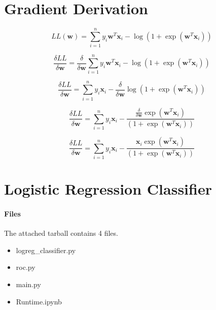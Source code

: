 \documentclass[11pt]{article}
\begin{document}
\maketitle

\section{Gradient Derivation}
\begin{equation}
    LL(\mathbf{w}) = \sum_{i=1}^n y_i\mathbf{w}^T\mathbf{x}_i - \log{(1 + \exp{(\mathbf{w}^T\mathbf{x}_i)})}
\end{equation}

\begin{equation}
    \frac{\delta LL}{\delta \mathbf{w}} = \frac{\delta}{\delta \mathbf{w}} \sum_{i=1}^n y_i\mathbf{w}^T\mathbf{x}_i - \log{(1 + \exp{(\mathbf{w}^T\mathbf{x}_i)})}
\end{equation}

\begin{equation}
    \frac{\delta LL}{\delta \mathbf{w}} = \sum_{i=1}^n y_i\mathbf{x}_i - \frac{\delta}{\delta \mathbf{w}} \log{(1 + \exp{(\mathbf{w}^T\mathbf{x}_i)})}
\end{equation}

\begin{equation}
    \frac{\delta LL}{\delta \mathbf{w}} = \sum_{i=1}^n y_i\mathbf{x}_i - \frac{\frac{\delta}{\delta \mathbf{w}} \exp{(\mathbf{w}^T\mathbf{x}_i)}}{(1 + \exp{(\mathbf{w}^T\mathbf{x}_i)})}
\end{equation}

\begin{equation}
    \frac{\delta LL}{\delta \mathbf{w}} = \sum_{i=1}^n y_i\mathbf{x}_i - \frac{\mathbf{x}_i \exp{(\mathbf{w}^T\mathbf{x}_i)}}{(1 + \exp{(\mathbf{w}^T\mathbf{x}_i)})}
\end{equation}
\section{Logistic Regression Classifier}

\paragraph{Files}
The attached tarball contains 4 files.

\begin{itemize}
    \item logreg\_classifier.py
    \item roc.py
    \item main.py
    \item Runtime.ipynb
\end{itemize}
\end{document}
